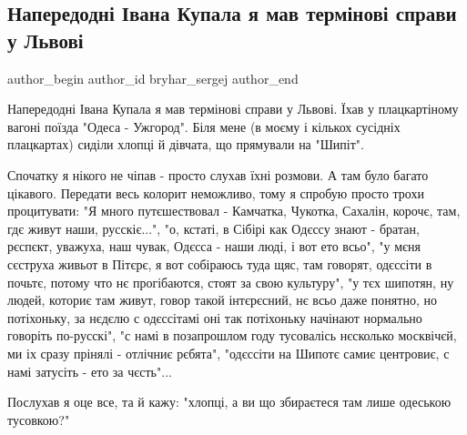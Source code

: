  
 
 
 
 
 
\subsection{Напередодні Івана Купала я мав термінові справи у Львові}
\label{sec:03_08_2021.fb.bryhar_sergej.1.lvov_poezd}
 
\ifcmt
 author_begin
   author_id bryhar_sergej
 author_end
\fi

Напередодні Івана Купала я мав термінові справи у Львові. Їхав у плацкартіному
вагоні поїзда "Одеса - Ужгород". Біля мене (в моєму і кількох сусідніх
плацкартах) сиділи хлопці й дівчата, що прямували на "Шипіт".

Спочатку я нікого не чіпав - просто слухав їхні розмови. А там було багато
цікавого. Передати весь колорит неможливо, тому я спробую просто трохи
процитувати: "Я много путєшествовал - Камчатка, Чукотка, Сахалін, корочє, там,
гдє живут наши, русскіє...", "о, кстаті, в Сібірі как Одєссу знают - братан,
рєспєкт, уважуха, наш чувак, Одєсса - наши люді, і вот ето всьо", "у мєня
сєструха живьот в Пітєрє, я вот собіраюсь туда щяс, там говорят, одєссіти в
почьтє, потому что нє прогібаются, стоят за свою культуру", "у тєх шипотян, ну
людей, коториє там живут, говор такой інтєрєсний, нє всьо даже понятно, но
потіхоньку, за нєдєлю с одєссітамі оні так потіхоньку начінают нормально
говоріть по-русскі", "с намі в позапрошлом году тусовалісь нєсколько москвічєй,
ми іх сразу прінялі - отлічниє рєбята", "одєссіти на Шипотє самиє центровиє, с
намі затусіть - ето за чєсть"...

Послухав я оце все, та й кажу: "хлопці, а ви що збираєтеся там лише одеською тусовкою?"


